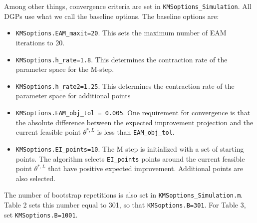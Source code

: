 \documentclass[12pt]{article}
\def\code#1{\texttt{#1}}
\begin{document}
 Among other things, convergence criteria  are set in \code{KMSoptions\_Simulation}.  All DGPs use what we call the baseline options.  %
The baseline options are:
\begin{itemize}
\item  \code{KMSoptions.EAM\_maxit=20}. This sets the maximum number of EAM iterations to 20.
\item \code{KMSoptions.h\_rate=1.8}. This determines the contraction rate of the parameter space for the M-step.
\item \code{KMSoptions.h\_rate2=1.25}.  This determines the contraction rate of the parameter space for additional points
\item \code{KMSoptions.EAM\_obj\_tol  = 0.005}.  One requirement for convergence is that the absolute difference between the expected improvement projection and the current feasible point $\theta^{*,L}$ is less than  \code{EAM\_obj\_tol}.
\item \code{KMSoptions.EI\_points=10}.  The M step is initialized with a set of starting points.  The algorithm selects \code{EI\_points} points around the current feasible point $\theta^{*,L}$ that have positive expected improvement.  Additional points are also selected.
\end{itemize}
The number of bootstrap repetitions is also set in \code{KMSoptions\_Simulation.m}.  Table 2 sets this number equal to 301, so that \code{KMSoptions.B=301}.  For Table 3, set \code{KMSoptions.B=1001}.
\end{document}
